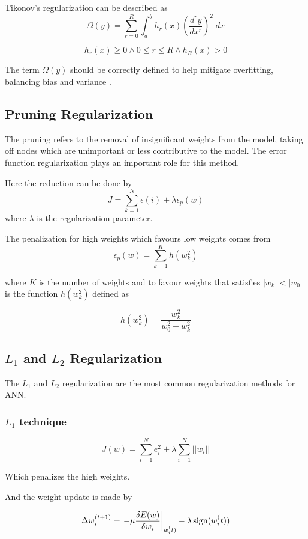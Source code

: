 \documentclass[
]{IEEEtran}
\begin{document}
Tikonov's regularization can be described as
\[\Omega(y) = \sum_{r=0}^{R} \int_a^b h_r(x) \left( \frac{d^r y}{dx^r} \right )^2\; dx \]

\[h_r(x) \geq 0 \wedge 0 \leq r \leq R \wedge h_R(x) > 0\]

The term \(\Omega(y)\) should be correctly defined to help mitigate
overfitting, balancing bias and variance .

\subsection{Pruning Regularization}\label{pruning-regularization}

The pruning refers to the removal of insignificant weights from the
model, taking off nodes which are unimportant or less contributive to
the model. The error function regularization plays an important role for
this method.

Here the reduction can be done by
\[ J = \sum_{k=1}^N \epsilon(i) + \lambda\epsilon _p(w)\] where
\(\lambda\) is the regularization parameter.

The penalization for high weights which favours low weights comes from
\[ \epsilon _p (w) = \sum _{k=1}^K h(w_ k^2) \]

where \(K\) is the number of weights and to favour weights that
satisfies \(|w_k| < |w_0|\) is the function \(h(w_ k^2)\) defined as

\[ h(w_k^2) = \frac{w_k^2}{w_0^2 + w_k^2} \]

\subsection{\texorpdfstring{\(L_1\) and \(L_2\)
Regularization}{L\_1 and L\_2 Regularization}}\label{l_1-and-l_2-regularization}

The \(L_1\) and \(L_2\) regularization are the most common
regularization methods for ANN.

\subsubsection{\texorpdfstring{\(L_1\)
technique}{L\_1 technique}}\label{l_1-technique}

\[ J(w) = \sum _{i=1}^N e^2_i + \lambda \sum _{i=1}^N ||w_i|| \]

Which penalizes the high weights.

And the weight update is made by

\[ \Delta w_i^{(t+1)} = \left. - \mu \frac{\delta E(w)}{\delta w_i}\right| _{w_i^(t)} - \lambda \operatorname{sign}(w_i^(t)) \]
\end{document}
